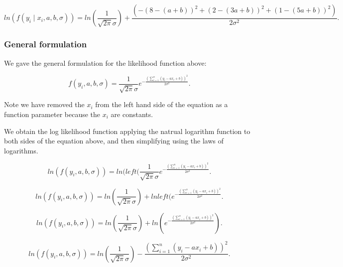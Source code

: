 \documentclass[a5paper,11pt]{article}
\begin{document}
\begin{equation}
ln \left( f\left(y_i \mid x_i, a, b, \sigma\right) \right)
 =  ln \left( \frac{1}{\sqrt{2\pi}\sigma} \right) + 
		\frac{
			\left(-\left( 8 -\left(a +b\right)\right)^2
			+ \left( 2 -\left(3a +b\right)\right)^2
			+ \left( 1 -\left(5a +b\right)\right)^2\right)
		  }
		{2\sigma^2}.
\end{equation}


\subsubsection{General formulation}

We gave the general formulation for the likelihood function above:

\begin{equation}
f\left(y_i, a, b, \sigma\right)
 =  \frac{1}{\sqrt{2\pi}\sigma}
	e^{-\frac{\left(\sum_{i=1}^{n} \left(y_i -ax_i+b\right)\right)^2}{2\sigma^2}}.
\end{equation}

Note we have removed the $x_i$ from the left hand side of the equation as a function
parameter because the $x_i$ are constants.

We obtain the log likelihood function applying the natrual logarithm function
to both sides of the equation above, and then simplifying using the laws of
logarithms.

\begin{equation}
ln\left(f\left(y_i, a, b, \sigma\right)\right)
 =  ln(left(\frac{1}{\sqrt{2\pi}\sigma}
	e^{-\frac{\left(\sum_{i=1}^{n} \left(y_i -ax_i+b\right)\right)^2}{2\sigma^2}}.
\end{equation}

\begin{equation}
ln\left(f\left(y_i, a, b, \sigma\right)\right)
 =  ln\left(\frac{1}{\sqrt{2\pi}\sigma} \right)
	 + lnleft(e^{-\frac{\left(\sum_{i=1}^{n} \left(y_i - ax_i+b\right)\right)^2}{2\sigma^2}}.
\end{equation}


\begin{equation}
ln\left(f\left(y_i, a, b, \sigma\right)\right)
 =  ln\left(\frac{1}{\sqrt{2\pi}\sigma} \right)
	 + ln\left(e^{-\frac{\left(\sum_{i=1}^{n} \left( y_i - ax_i+b\right)\right)^2}{2\sigma^2}} \right).
\end{equation}

\begin{equation}
ln\left(f\left(y_i, a, b, \sigma\right)\right)
 =  ln\left(\frac{1}{\sqrt{2\pi}\sigma} \right)
    - \frac{\left(\sum_{i=1}^{n} \left( y_i -ax_i+b\right)\right)^2}{2\sigma^2}.
\end{equation}
\end{document}
